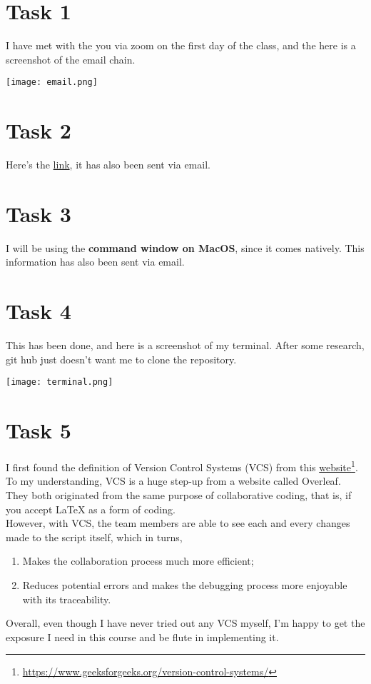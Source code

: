 \documentclass{article}
\begin{document}
\section{Task 1}
I have met with the you via zoom on the first day of the class, and the here is a screenshot of the email chain.
\begin{center}
\texttt{[image: email.png]}
\end{center}

\vspace{5pt}

\section{Task 2}
Here's the \href{https://gobymark.github.io/math4610/}{link}, it has also been sent via email.

\vspace{5pt}

\section{Task 3}

I will be using the {\bf command window on MacOS}, since it comes natively. This information has also been sent via email.

\pagebreak

\section{Task 4}
This has been done, and here is a screenshot of my terminal. After some research, git hub just doesn't want me to clone the repository.
\begin{center}
\texttt{[image: terminal.png]}
\end{center}


\vspace{5pt}

\section{Task 5}

I first found the definition of Version Control Systems (VCS) from this \href{https://www.geeksforgeeks.org/version-control-systems/}{website}\footnote{\url{https://www.geeksforgeeks.org/version-control-systems/}}. To my understanding, VCS is a huge step-up from a website called Overleaf. They both originated from the same purpose of collaborative coding, that is, if you accept {\LaTeX} as a form of coding.\\
However, with VCS, the team members are able to see each and every changes made to the script itself, which in turns, 
\begin{enumerate}
\item[1.] Makes the collaboration process much more efficient; 
\item[2.] Reduces potential errors and makes the debugging process more enjoyable with its traceability.
\end{enumerate}
Overall, even though I have never tried out any VCS myself, I'm happy to get the exposure I need in this course and be flute in implementing it.  
\end{document}
